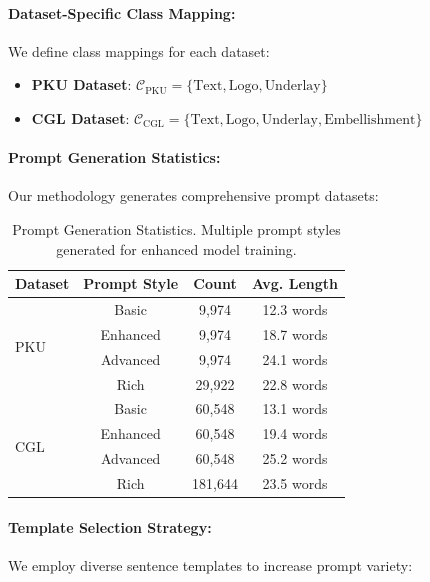 \documentclass[journal,article,submit,pdftex,moreauthors]{Definitions/mdpi}
\begin{document}
\paragraph{Dataset-Specific Class Mapping:}

We define class mappings for each dataset:

\begin{itemize}
\item \textbf{PKU Dataset}: $\mathcal{C}_{\text{PKU}} = \{\text{Text}, \text{Logo}, \text{Underlay}\}$
\item \textbf{CGL Dataset}: $\mathcal{C}_{\text{CGL}} = \{\text{Text}, \text{Logo}, \text{Underlay}, \text{Embellishment}\}$
\end{itemize}

\paragraph{Prompt Generation Statistics:}

Our methodology generates comprehensive prompt datasets:

\begin{table}[H]
\caption{Prompt Generation Statistics. Multiple prompt styles generated for enhanced model training.\label{tab:prompt_stats}}
\begin{tabularx}{\textwidth}{lccc}
\toprule
\textbf{Dataset} & \textbf{Prompt Style} & \textbf{Count} & \textbf{Avg. Length}\\
\midrule
\multirow{4}{*}{PKU} & Basic & 9,974 & 12.3 words\\
 & Enhanced & 9,974 & 18.7 words\\
 & Advanced & 9,974 & 24.1 words\\
 & Rich & 29,922 & 22.8 words\\
\midrule
\multirow{4}{*}{CGL} & Basic & 60,548 & 13.1 words\\
 & Enhanced & 60,548 & 19.4 words\\
 & Advanced & 60,548 & 25.2 words\\
 & Rich & 181,644 & 23.5 words\\
\bottomrule
\end{tabularx}
\end{table}

\paragraph{Template Selection Strategy:}

We employ diverse sentence templates to increase prompt variety:
\end{document}
